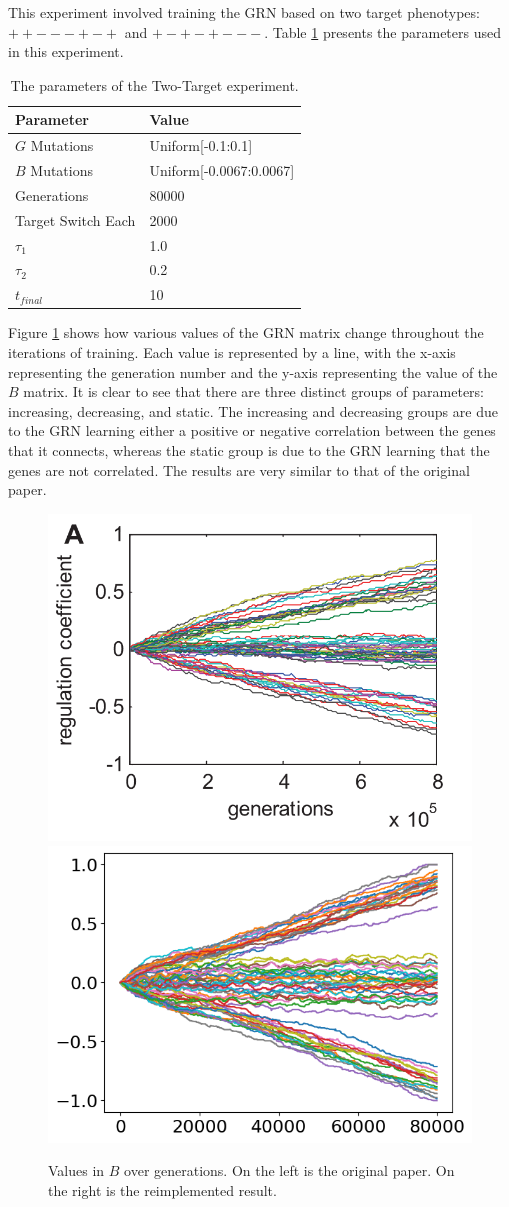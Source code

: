 \documentclass[twocolumn,a4paper,11pt]{article}
\begin{document}
    This experiment involved training the GRN based on two target phenotypes: $++---+-+$ and $+-+-+---$. Table \ref{tbl:ex-ttgrn-param} presents the parameters used in this experiment.

    \begin{table}[h]
        \centering
        \begin{tabular}{l|l}
        Parameter & Value \\ \hline
        $G$ Mutations & Uniform[-0.1:0.1] \\
        $B$ Mutations & Uniform[-0.0067:0.0067] \\
        Generations & 80000 \\
        Target Switch Each & 2000 \\
        $\tau_1$ & 1.0 \\
        $\tau_2$ & 0.2 \\
        $t_{final}$ & 10
        \end{tabular}
        \caption{The parameters of the Two-Target experiment.} \label{tbl:ex-ttgrn-param}
    \end{table}

    Figure \ref{fig:2a} shows how various values of the GRN matrix change throughout the iterations of training. Each value is represented by a line, with the x-axis representing the generation number and the y-axis representing the value of the $B$ matrix. It is clear to see that there are three distinct groups of parameters: increasing, decreasing, and static. The increasing and decreasing groups are due to the GRN learning either a positive or negative correlation between the genes that it connects, whereas the static group is due to the GRN learning that the genes are not correlated. The results are very similar to that of the original paper.
    \begin{figure}[h]
        \centering
        \includegraphics[width=0.48\linewidth]{orig_img/fig2a.png}
        \includegraphics[width=0.48\linewidth]{img/fig2a.png}
        \caption{Values in $B$ over generations. On the left is the original paper. On the right is the reimplemented result.} \label{fig:2a}
    \end{figure}
\end{document}
